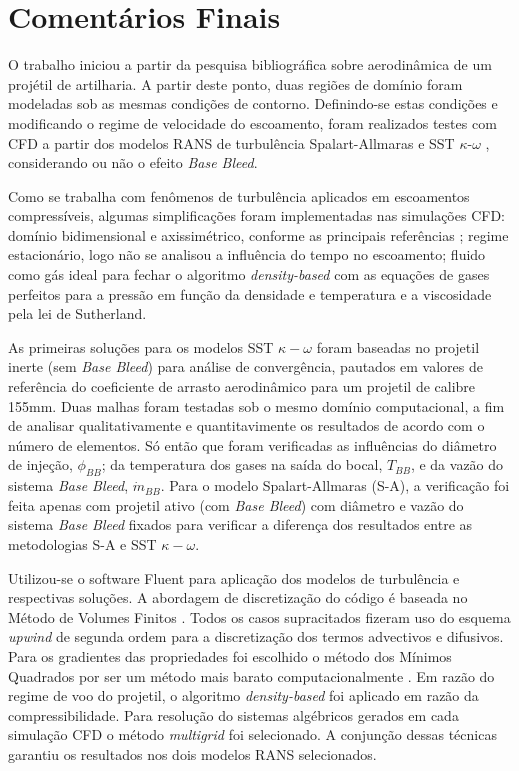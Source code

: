 \chapter{Comentários Finais}\label{cap:conclusoes}

O trabalho iniciou a partir da pesquisa bibliográfica sobre aerodinâmica de um projétil de artilharia. A partir deste ponto, duas regiões de domínio foram modeladas sob as mesmas condições de contorno. Definindo-se estas condições e modificando o regime de velocidade do escoamento, foram realizados testes com CFD a partir dos modelos RANS de turbulência Spalart-Allmaras \cite{Spalart1992} e SST $\kappa$-$\omega$ \cite{Menter1994TwoequationET,Menter2003,Menter2009}, considerando ou não o efeito \textit{Base Bleed}.

Como se trabalha com fenômenos de turbulência aplicados em escoamentos compressíveis, algumas simplificações foram implementadas nas simulações CFD: domínio bidimensional e axissimétrico, conforme as principais referências \cite{Mahmoud2009,Lucena2020}; regime estacionário, logo não se analisou a influência do tempo no escoamento; fluido como gás ideal para fechar o algoritmo \textit{density-based} com as equações de gases perfeitos para a pressão em função da densidade e temperatura e a viscosidade pela lei de Sutherland.

As primeiras soluções para os modelos SST $\kappa-\omega$ foram baseadas no projetil inerte (sem \textit{Base Bleed}) para análise de convergência, pautados em valores de referência \cite{Mahmoud2009} do coeficiente de arrasto aerodinâmico para um projetil de calibre 155mm. Duas malhas foram testadas sob o mesmo domínio computacional, a fim de analisar qualitativamente e quantitavimente os resultados de acordo com o número de elementos. Só então que foram verificadas as influências do diâmetro de injeção, \(\phi_{BB}\); da temperatura dos gases na saída do bocal, \(T_{BB}\), e da vazão do sistema \textit{Base Bleed}, \(\Dot{m}_{BB}\). Para o modelo Spalart-Allmaras (S-A), a verificação foi feita apenas com projetil ativo (com \textit{Base Bleed}) com diâmetro e vazão do sistema \textit{Base Bleed} fixados para verificar a diferença dos resultados entre as metodologias S-A e SST $\kappa-\omega$.

Utilizou-se o software Fluent \cite{fluent2021ansys} para aplicação dos modelos de turbulência e respectivas soluções. A abordagem de discretização do código é baseada no Método de Volumes Finitos \cite{McDonald1971,MacComarck&Paulay1972}. Todos os casos supracitados fizeram uso do esquema \textit{upwind} de segunda ordem para a discretização dos termos advectivos e difusivos. Para os gradientes das propriedades foi escolhido o método dos Mínimos Quadrados por ser um método mais barato computacionalmente \cite{fluent2021ansys}. Em razão do regime de voo do projetil, o algoritmo \textit{density-based} \cite{Weiss1995PreconditioningAT,Weiss1997IMPLICITSO,Weiss1999ImplicitSO} foi aplicado em razão da compressibilidade. Para resolução do sistemas algébricos gerados em cada simulação CFD o método \textit{multigrid} \cite{Hutchinson1986} foi selecionado. A conjunção dessas técnicas garantiu os resultados nos dois modelos RANS selecionados.

